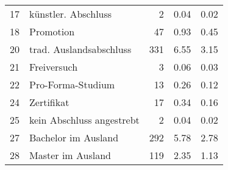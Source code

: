 \begin{longtable}{lXrrr}
        17 & \multicolumn{1}{X}{künstler. Abschluss} & %
          \num{2} &
          \num[round-mode=places,round-precision=2]{0.04} &
          \num[round-mode=places,round-precision=2]{0.02} \\

        18 & \multicolumn{1}{X}{Promotion} & %
          \num{47} &
          \num[round-mode=places,round-precision=2]{0.93} &
          \num[round-mode=places,round-precision=2]{0.45} \\

        20 & \multicolumn{1}{X}{trad. Auslandsabschluss} & %
          \num{331} &
          \num[round-mode=places,round-precision=2]{6.55} &
          \num[round-mode=places,round-precision=2]{3.15} \\

        21 & \multicolumn{1}{X}{Freiversuch} & %
          \num{3} &
          \num[round-mode=places,round-precision=2]{0.06} &
          \num[round-mode=places,round-precision=2]{0.03} \\

        22 & \multicolumn{1}{X}{Pro-Forma-Studium} & %
          \num{13} &
          \num[round-mode=places,round-precision=2]{0.26} &
          \num[round-mode=places,round-precision=2]{0.12} \\

        24 & \multicolumn{1}{X}{Zertifikat} & %
          \num{17} &
          \num[round-mode=places,round-precision=2]{0.34} &
          \num[round-mode=places,round-precision=2]{0.16} \\

        25 & \multicolumn{1}{X}{kein Abschluss angestrebt} & %
          \num{2} &
          \num[round-mode=places,round-precision=2]{0.04} &
          \num[round-mode=places,round-precision=2]{0.02} \\

        27 & \multicolumn{1}{X}{Bachelor im Ausland} & %
          \num{292} &
          \num[round-mode=places,round-precision=2]{5.78} &
          \num[round-mode=places,round-precision=2]{2.78} \\

        28 & \multicolumn{1}{X}{Master im Ausland} & %
          \num{119} &
          \num[round-mode=places,round-precision=2]{2.35} &
          \num[round-mode=places,round-precision=2]{1.13} \\


\end{longtable}
